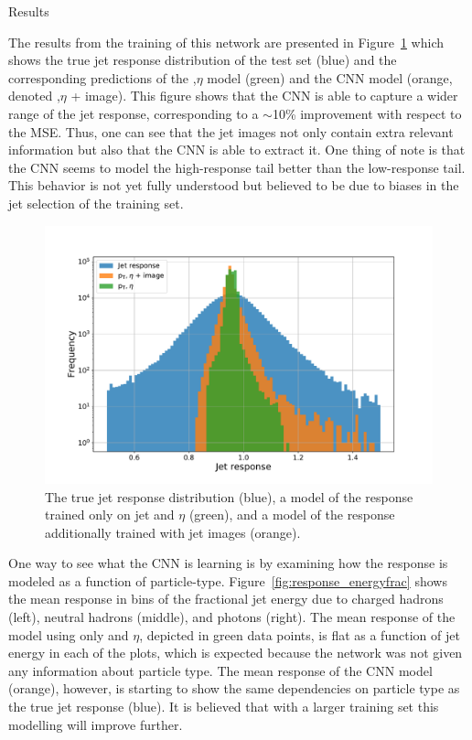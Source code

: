 \begin{section}{Results}

The results from the training of this network are presented in Figure~\ref{fig:cnn_prediction} which shows the true jet response distribution of the test set (blue) and the corresponding predictions of the \pT,$\eta$ model (green) and the CNN model (orange, denoted \pT,$\eta$ + image).
This figure shows that the CNN is able to capture a wider range of the jet response, corresponding to a $\sim$10\% improvement with respect to the MSE.
Thus, one can see that the jet images not only contain extra relevant information but also that the CNN is able to extract it.
One thing of note is that the CNN seems to model the high-response tail better than the low-response tail.
This behavior is not yet fully understood but believed to be due to biases in the jet selection of the training set.

\begin{figure}[tbp!]
\begin{center}
\includegraphics[angle=0,width=0.80\columnwidth]{fig/cnn_prediction.pdf}
\end{center}
\caption{The true jet response distribution (blue), a model of the response trained only on jet \pT and $\eta$ (green), and a model of the response additionally trained with jet images (orange).}
\label{fig:cnn_prediction}
\end{figure}

One way to see what the CNN is learning is by examining how the response is modeled as a function of particle-type.
Figure~\ref{fig:response_energyfrac} shows the mean response in bins of the fractional jet energy due to charged hadrons (left), neutral hadrons (middle), and photons (right).
The mean response of the model using only \pT and $\eta$, depicted in green data points, is flat as a function of jet energy in each of the plots, which is expected because the network was not given any information about particle type.
The mean response of the CNN model (orange), however, is starting to show the same dependencies on particle type as the true jet response (blue).
It is believed that with a larger training set this modelling will improve further.


\end{section}
